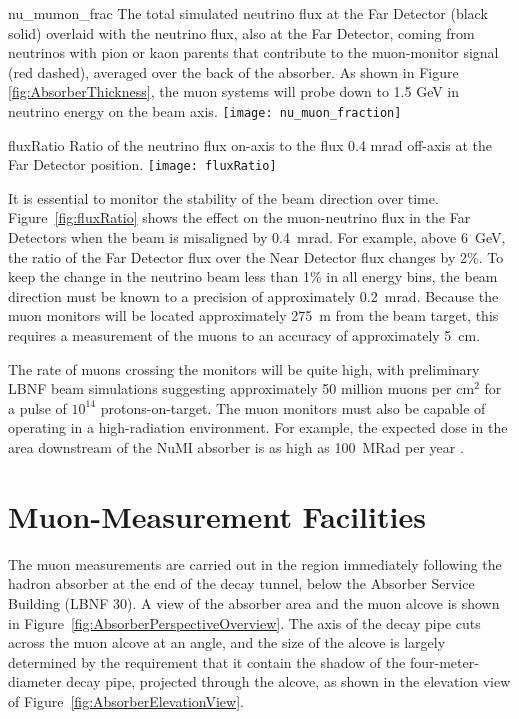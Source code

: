 \begin{cdrfigure}{nu_mumon_frac}
{The total simulated neutrino flux at the Far Detector (black solid) overlaid with the neutrino flux, also at the Far Detector, coming from neutrinos with pion or kaon parents that contribute to the muon-monitor signal (red dashed), averaged over the back of the absorber. As shown in Figure \ref{fig:AbsorberThickness}, the muon systems will probe down to 1.5 GeV in neutrino energy on the beam axis.}
\texttt{[image: nu\_muon\_fraction]}
\end{cdrfigure}

\begin{cdrfigure}{fluxRatio}
{Ratio of the neutrino flux on-axis to the flux 0.4 mrad off-axis at the Far
Detector position.}
\texttt{[image: fluxRatio]}
\end{cdrfigure}

It is essential to monitor the stability of the beam direction over
time. Figure~\ref{fig:fluxRatio} shows the effect on the muon-neutrino
flux in the Far Detectors when the beam is misaligned by 0.4~mrad.  
For example, above 6~GeV, the ratio of the Far Detector flux over 
the Near Detector flux changes by 2\%.  
To keep the change in the neutrino beam less than 1\% in all energy bins,
the beam direction must be known to a precision of approximately 0.2~mrad. 
Because the muon monitors will be located approximately 275~m
from the beam target, this requires a measurement of the muons to an
accuracy of approximately 5~cm.

The rate of muons crossing the monitors will be quite high, with
preliminary LBNF beam simulations suggesting approximately 50 million
muons per cm$^{2}$ for a pulse of $10^{14}$ protons-on-target. The
muon monitors must also be capable of operating in a high-radiation
environment.  For example, the expected dose in the area downstream of
the NuMI absorber is as high as 100~MRad per year \cite{ref:NuMIBeamMonitors}.

%
%
\section{Muon-Measurement Facilities}
\label{sec:nd-blm-muon-measurement-facilities}

The muon measurements are carried out in the region immediately
following the hadron absorber at the end of the decay tunnel, below
the Absorber Service Building (LBNF 30).  A view
of the absorber area and the muon alcove is shown in Figure~\ref{fig:AbsorberPerspectiveOverview}. 
The axis of the decay pipe cuts across the muon alcove at an angle, and the size of the alcove
is largely determined by the requirement that it contain the
shadow of the four-meter-diameter decay pipe, projected through the
alcove, as shown in the elevation view of Figure~\ref{fig:AbsorberElevationView}. 

